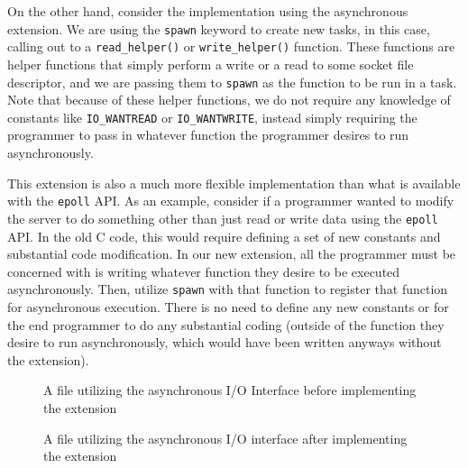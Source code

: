 \documentclass[main.tex]{subfiles}
\begin{document}
On the other hand, consider the implementation using the asynchronous extension. We are using the
\verb|spawn| keyword to create new tasks, in this case, calling out to a \verb|read_helper()| or \verb|write_helper()| function. These
functions are helper functions that simply perform a write or a read to some socket file descriptor, and we are passing them to 
\verb|spawn| as the function to be run in a task. Note that because of these helper functions, we do not require any knowledge of
constants like \verb|IO_WANTREAD| or \verb|IO_WANTWRITE|, instead simply requiring the programmer to pass in whatever function
the programmer desires to run asynchronously.

This extension is also a much more flexible implementation than what is available with the \verb|epoll| API. As an example,
consider if a programmer wanted to modify the server to do something other than just read or write data using the \verb|epoll|
API. In the old C code, this would require defining a set of new constants and substantial code modification. In our new
extension, all the programmer must be concerned with is writing whatever function they desire to be executed asynchronously.
Then, utilize \verb|spawn| with that function to register that function for asynchronous execution. There is no need to define
any new constants or for the end programmer to do any substantial coding (outside of the function they desire to run
asynchronously, which would have been written anyways without the extension).

\begin{figure}
	
	\caption{A file utilizing the asynchronous I/O Interface before implementing the extension}
\end{figure}
\begin{figure}
	
	\caption{A file utilizing the asynchronous I/O interface after implementing the extension}
\end{figure}
\end{document}
